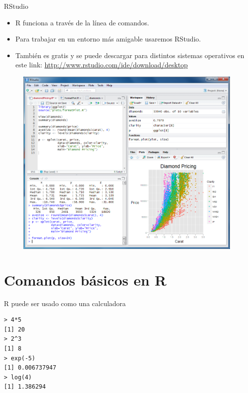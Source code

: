 \documentclass[handout]{beamer}
\begin{document}
\begin{frame}{RStudio}
\scriptsize{
\begin{itemize}
 \item R funciona a través de la línea de comandos.
 \item Para trabajar en un entorno más amigable usaremos RStudio.
 \item También es gratis y se puede descargar para distintos sistemas operativos en este link: \url{http://www.rstudio.com/ide/download/desktop}
\end{itemize}

} 

\begin{figure}[h!]
	\centering
	\includegraphics[scale=0.2]{pics/rstudio.png}
\end{figure}

 
\end{frame}


\section{Comandos básicos en R}

\begin{frame}[fragile]{R puede ser usado como una calculadora}
\begin{verbatim}
> 4*5
[1] 20
> 2^3
[1] 8
> exp(-5)
[1] 0.006737947
> log(4)
[1] 1.386294
\end{verbatim}


 
\end{frame}
\end{document}
